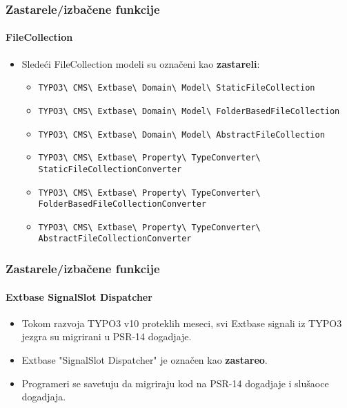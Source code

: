 \begin{frame}[fragile]
	\frametitle{Zastarele/izbačene funkcije}
	\framesubtitle{FileCollection}

	\begin{itemize}
		\item Sledeći FileCollection modeli su označeni kao  \textbf{zastareli}:
			\vspace{0.4cm}
			\begin{itemize}\tiny
				\item \texttt{TYPO3\textbackslash
					CMS\textbackslash
					Extbase\textbackslash
					Domain\textbackslash
					Model\textbackslash
					StaticFileCollection}

				\item \texttt{TYPO3\textbackslash
					CMS\textbackslash
					Extbase\textbackslash
					Domain\textbackslash
					Model\textbackslash
					FolderBasedFileCollection}

				\item \texttt{TYPO3\textbackslash
					CMS\textbackslash
					Extbase\textbackslash
					Domain\textbackslash
					Model\textbackslash
					AbstractFileCollection}

				\item \texttt{TYPO3\textbackslash
					CMS\textbackslash
					Extbase\textbackslash
					Property\textbackslash
					TypeConverter\textbackslash
					StaticFileCollectionConverter}

				\item \texttt{TYPO3\textbackslash
					CMS\textbackslash
					Extbase\textbackslash
					Property\textbackslash
					TypeConverter\textbackslash
					FolderBasedFileCollectionConverter}

				\item \texttt{TYPO3\textbackslash
					CMS\textbackslash
					Extbase\textbackslash
					Property\textbackslash
					TypeConverter\textbackslash
					AbstractFileCollectionConverter}

			\end{itemize}

	\end{itemize}

\end{frame}


\begin{frame}[fragile]
	\frametitle{Zastarele/izbačene funkcije}
	\framesubtitle{Extbase SignalSlot Dispatcher}

	\begin{itemize}
		\item Tokom razvoja TYPO3 v10 proteklih meseci, svi Extbase signali iz TYPO3 jezgra su migrirani u PSR-14 dogadjaje.
		\item Extbase "SignalSlot Dispatcher" je označen kao \textbf{zastareo}.
		\item Programeri se savetuju da migriraju kod na PSR-14 dogadjaje i slušaoce dogadjaja.
	\end{itemize}

\end{frame}

